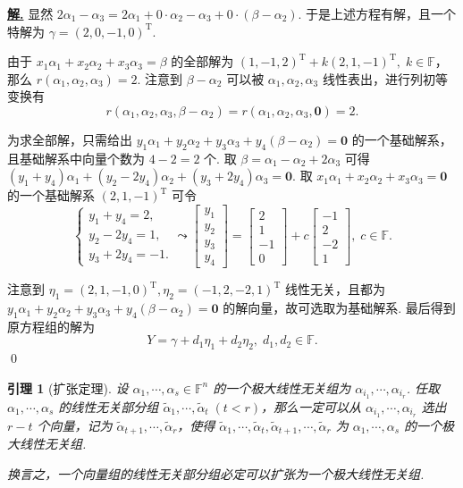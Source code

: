 \documentclass[10pt,openany]{article}
\theoremstyle{thmstyle} %
\theoremstyle{defstyle} %
\newtheorem{lemma}[theorem]{引理}
\theoremstyle{prostyle} %
\theoremstyle{exastyle}
\theoremstyle{remstyle}
\newenvironment{solution}{\par\underline{\textbf{解.}} \;\fangsong}{\qed\par}
\newcommand{\T}{^{\text{T}}}
\newcommand{\F}{\mathbb{F}}
\begin{document}
\begin{solution}
	显然 \(2\alpha_1-\alpha_3=2\alpha_1+0\cdot\alpha_2-\alpha_3+0\cdot(\beta-\alpha_2)\). 于是上述方程有解，且一个特解为 \( \gamma=(2,0,-1,0)\T \). 
	
	由于 \( x_1\alpha_1+x_2\alpha_2+x_3\alpha_3=\beta \) 的全部解为 \( (1,-1,2)\T+ k(2,1,-1)\T, \; k \in \F \)，那么 \( r(\alpha_1,\alpha_2,\alpha_3)=2 \). 注意到 \( \beta-\alpha_2 \) 可以被 \( \alpha_1,\alpha_2,\alpha_3 \) 线性表出，进行列初等变换有
	\[ r(\alpha_1,\alpha_2,\alpha_3,\beta-\alpha_2)=r(\alpha_1,\alpha_2,\alpha_3,\bm{0})=2. \]
	
	为求全部解，只需给出 \( y_1\alpha_1+y_2\alpha_2+y_3\alpha_3+y_4(\beta-\alpha_2)=\bm{0} \) 的一个基础解系，且基础解系中向量个数为 \( 4-2=2 \) 个. 取 \( \beta= \alpha_1-\alpha_2+2\alpha_3 \) 可得 \( (y_1+y_4)\alpha_1+(y_2-2y_4)\alpha_2+(y_3+2y_4)\alpha_3=\bm{0} \). 取 \( x_1\alpha_1+x_2\alpha_2+x_3\alpha_3=\bm{0} \) 的一个基础解系 \( (2,1,-1)\T \) 可令
	\[ \left\{ \begin{array}{l}
		y_1+y_4=2, \\
		y_2-2y_4=1, \\
		y_3+2y_4=-1.
	\end{array} \right. \leadsto \begin{bmatrix}
	  y_1 \\ y_2 \\ y_3 \\ y_4
	\end{bmatrix}= \begin{bmatrix}
	 2 \\ 1 \\ -1 \\ 0
	\end{bmatrix}+ c \begin{bmatrix}
	 -1 \\ 2 \\ -2 \\ 1
	\end{bmatrix}, \; c \in \F. \]
	
	注意到 \( \eta_1=(2,1,-1,0)\T, \eta_2=(-1,2,-2,1)\T \) 线性无关，且都为 \( y_1\alpha_1+y_2\alpha_2+y_3\alpha_3+y_4(\beta-\alpha_2)=\bm{0} \) 的解向量，故可选取为基础解系. 最后得到原方程组的解为
	\[ Y= \gamma+d_1 \eta_1+d_2\eta_2, \; d_1,d_2 \in \F. \]
\end{solution}



\begin{lemma}[扩张定理] \label{5.3.6}
	设 \( \alpha_1,\cdots,\alpha_s \in \F^n \) 的一个极大线性无关组为 \( \alpha_{i_1},\cdots,\alpha_{i_r} \). 任取 \( \alpha_1,\cdots,\alpha_s \) 的线性无关部分组 \( \widetilde{\alpha}_1,\cdots,\widetilde{\alpha}_t \; (t<r) \)，那么一定可以从 \( \alpha_{i_1},\cdots,\alpha_{i_r} \) 选出 \( r-t \) 个向量，记为 \( \widetilde{\alpha}_{t+1},\cdots,\widetilde{\alpha}_{r} \)，使得 \( \widetilde{\alpha}_1,\cdots,\widetilde{\alpha}_t,\widetilde{\alpha}_{t+1},\cdots,\widetilde{\alpha}_{r} \) 为 \( \alpha_1,\cdots,\alpha_s  \) 的一个极大线性无关组. 
	
	换言之，一个向量组的线性无关部分组必定可以扩张为一个极大线性无关组.
\end{lemma}
\end{document}
